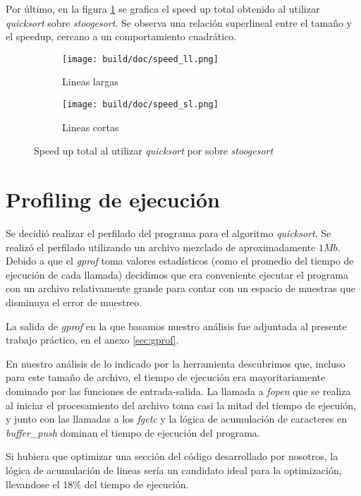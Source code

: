 \documentclass[a4paper,11pt]{article}
\begin{document}
Por último, en la figura \ref{fig:speedup} se grafica el speed up total
obtenido al utilizar \textit{quicksort} sobre \textit{stoogesort}. Se observa
una relación superlineal entre el tamaño y el speedup, cercano a un
comportamiento cuadrático.

\begin{figure}
  \begin{subfigure}[b]{\textwidth}
    \centering
    \texttt{[image: build/doc/speed\_ll.png]}
    \caption{Lineas largas}
  \end{subfigure}%

  \begin{subfigure}[b]{\textwidth}
    \centering
    \texttt{[image: build/doc/speed\_sl.png]}
    \caption{Lineas cortas}
  \end{subfigure}
  \caption{Speed up total al utilizar \textit{quicksort} por sobre \textit{stoogesort}}\label{fig:speedup}
\end{figure}

\FloatBarrier

\section{Profiling de ejecución}

Se decidió realizar el perfilado del programa para el algoritmo
\textit{quicksort}. Se realizó el perfilado utilizando un archivo mezclado de
aproximadamente \(1Mb\). Debido a que el \textit{gprof} toma valores
estadísticos (como el promedio del tiempo de ejecución de cada llamada)
decidimos que era conveniente ejecutar el programa con un archivo relativamente
grande para contar con un espacio de muestras que disminuya el error de
muestreo.

La salida de \textit{gprof} en la que basamos nuestro análisis fue adjuntada al
presente trabajo práctico, en el anexo \ref{sec:gprof}.

En nuestro análisis de lo indicado por la herramienta descubrimos que, incluso
para este tamaño de archivo, el tiempo de ejecución era mayoritariamente
dominado por las funciones de entrada-salida. La llamada a \textit{fopen} que
se realiza al iniciar el procesamiento del archivo toma casi la mitad del
tiempo de ejecuión, y junto con las llamadas a los \textit{fgetc} y la lógica
de acumulación de caracteres en \textit{buffer\_push} dominan el tiempo de
ejecución del programa.

Si hubiera que optimizar una sección del código desarrollado por nosotros, la
lógica de acumulación de lineas sería un candidato ideal para la optimización,
llevandose el 18\% del tiempo de ejecución.
\end{document}
